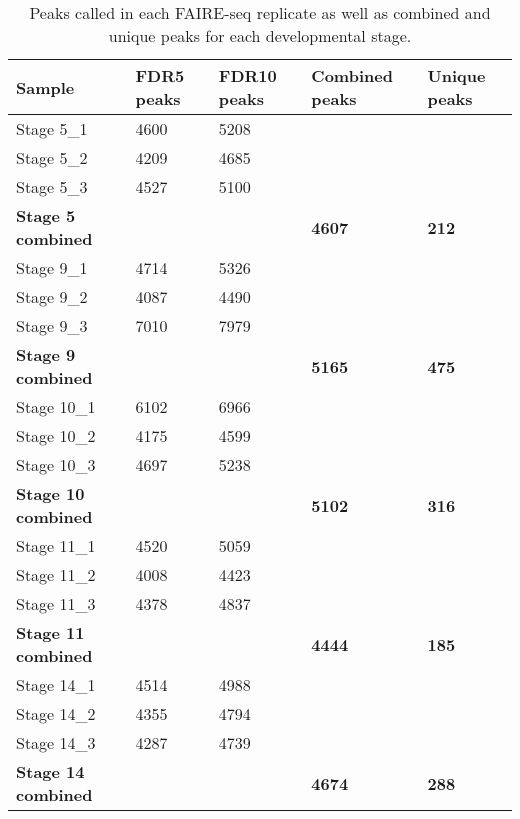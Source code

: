 \begin{table}[h]
\centering
\begin{tabular}{|l|l|l|p{2cm}|p{2cm}|}
\hline
\textbf{Sample}            & \textbf{FDR5 peaks} & \textbf{FDR10 peaks} & \textbf{Combined peaks} & \textbf{Unique peaks} \\ \hline
Stage 5\_1        & 4600       & 5208        &                &              \\ \hline
Stage 5\_2        & 4209       & 4685        &                &              \\ \hline
Stage 5\_3        & 4527       & 5100        &                &              \\ \hline
\textbf{Stage 5 combined}  &            &             & \textbf{4607}           & \textbf{212}          \\ \hline
Stage 9\_1        & 4714       & 5326        &                &              \\ \hline
Stage 9\_2        & 4087       & 4490        &                &              \\ \hline
Stage 9\_3        & 7010       & 7979        &                &              \\ \hline
\textbf{Stage 9 combined}  &            &             & \textbf{5165}           & \textbf{475}          \\ \hline
Stage 10\_1       & 6102       & 6966        &                &              \\ \hline
Stage 10\_2       & 4175       & 4599        &                &              \\ \hline
Stage 10\_3       & 4697       & 5238        &                &              \\ \hline
\textbf{Stage 10 combined} &            &             & \textbf{5102}           & \textbf{316}          \\ \hline
Stage 11\_1       & 4520       & 5059        &                &              \\ \hline
Stage 11\_2       & 4008       & 4423        &                &              \\ \hline
Stage 11\_3       & 4378       & 4837        &                &              \\ \hline
\textbf{Stage 11 combined} &            &             & \textbf{4444}           & \textbf{185}          \\ \hline
Stage 14\_1       & 4514       & 4988        &                &              \\ \hline
Stage 14\_2       & 4355       & 4794        &                &              \\ \hline
Stage 14\_3       & 4287       & 4739        &                &              \\ \hline
\textbf{Stage 14 combined} &            &             & \textbf{4674}           & \textbf{288}          \\ \hline
\end{tabular}
\caption{Peaks called in each FAIRE-seq replicate as well as combined and unique peaks for each developmental stage.}
\label{Table 6.2}
\end{table}

